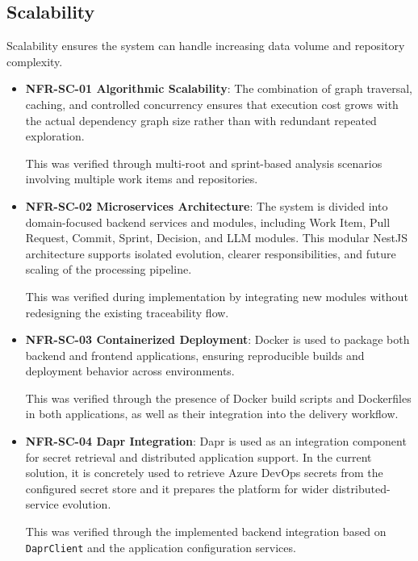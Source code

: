 % 
\subsection{Scalability}

Scalability ensures the system can handle increasing data volume and repository complexity.

\begin{itemize}

\item \textbf{NFR-SC-01  Algorithmic Scalability}:  
The combination of graph traversal, caching, and controlled concurrency ensures that execution cost grows with the actual dependency graph size rather than with redundant repeated exploration.

This was verified through multi-root and sprint-based analysis scenarios involving multiple work items and repositories.

\item \textbf{NFR-SC-02  Microservices Architecture}:  
The system is divided into domain-focused backend services and modules, including Work Item, Pull Request, Commit, Sprint, Decision, and LLM modules. This modular NestJS architecture supports isolated evolution, clearer responsibilities, and future scaling of the processing pipeline.

This was verified during implementation by integrating new modules without redesigning the existing traceability flow.

\item \textbf{NFR-SC-03  Containerized Deployment}:  
Docker is used to package both backend and frontend applications, ensuring reproducible builds and deployment behavior across environments.

This was verified through the presence of Docker build scripts and Dockerfiles in both applications, as well as their integration into the delivery workflow.

\item \textbf{NFR-SC-04  Dapr Integration}:  
Dapr is used as an integration component for secret retrieval and distributed application support. In the current solution, it is concretely used to retrieve Azure DevOps secrets from the configured secret store and it prepares the platform for wider distributed-service evolution.

This was verified through the implemented backend integration based on \texttt{DaprClient} and the application configuration services.

\end{itemize}

